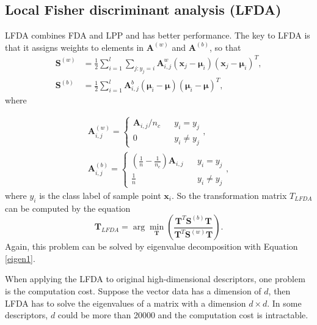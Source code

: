 \subsection{Local Fisher discriminant analysis (LFDA)}
\indent LFDA \cite{LFDA} combines FDA and LPP and has better performance. The key to LFDA is that it assigns weights to elements in $\bm{A}^{(w)}$ and $\bm{A}^{(b)}$, so that
\begin{equation}
\begin{aligned}
\bm{S}^{(w)} &= \frac{1}{2}\sum _{i=1}^l\sum_{j:y_j = i} \bm{A}_{i,j}^w (\bm{x}_j - \bm{\mu}_i)(\bm{x}_j - \bm{\mu}_i)^T,\\
\bm{S}^{(b)} &=  \frac{1}{2}\sum _{i=1}^l \bm{A}_{i,j}^b(\bm{\mu}_i - \bm{\mu})(\bm{\mu}_i - \bm{\mu})^T,
\end{aligned}
\end{equation}
where 

\begin{equation}
\begin{aligned}
\bm{A}_{i,j}^{(w)} = \left \{ 
\begin{array}{rcl}
\bm{A}_{i,j}/n_c &  &y_i = y_j \\
0 & & {y_i \ne y_j }
\end{array}
  \right. , \\
  \bm{A}_{i,j}^{(b)} = \left \{ 
\begin{array}{rcl}
(\frac{1}{n} - \frac{1}{n_c})  \bm{A}_{i,j} &  &{y_i = y_j }\\
\frac{1}{n} & & {y_i \ne y_j }
\end{array}
  \right. ,
 \end{aligned}
\end{equation}
where $y_i$ is the class label of sample point $\bm{x}_i$. So the transformation matrix $T_{LFDA}$ can be computed by the equation
\begin{equation}\label{eigencompute1} 
\bm{T}_{LFDA}  = \arg\min_{\bm{T}} (\frac{\bm{T}^T\bm{S}^{(b)}\bm{T}}{\bm{T}^T\bm{S}^{(w)}\bm{T}}).
\end{equation}
Again, this problem can be solved by eigenvalue decomposition with Equation \ref{eigen1}. 



When applying the LFDA to original high-dimensional descriptors, one problem is the computation cost. Suppose the vector data has a dimension of $d$, then LFDA has to solve the eigenvalues of a matrix with a dimension $d\times d$. In some descriptors, $d$ could be more than 20000 and the computation cost is intractable. 
 
